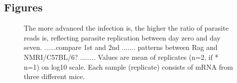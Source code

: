 \documentclass{bmcart}
\begin{document}
\begin{backmatter}



\section*{Figures}
\begin{figure}[h!]
  \caption{
  The more advanced the infection is, the higher the ratio of parasite reads is, reflecting parasite replication between day zero and day seven. ......compare 1st and 2nd ....... patterns between Rag and NMRI/C57BL/6?  ........ Values are mean of replicates (n=2, if * n=1) on log10 scale. Each sample (replicate) consists of mRNA from three different mice.}
  \end{figure}



\end{backmatter}
\end{document}
